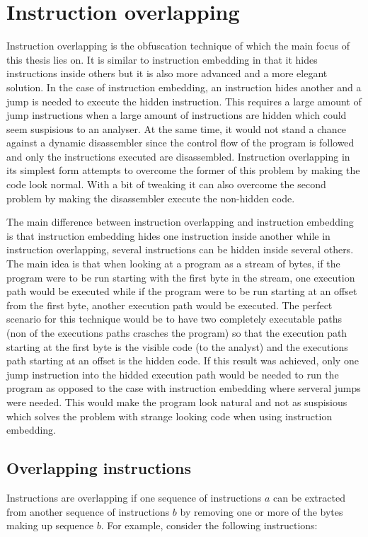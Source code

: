 \documentclass[11pt,twoside]{eitExjobb}
\begin{document}
\section{Instruction overlapping}
Instruction overlapping is the obfuscation technique of which the main focus of this thesis lies on. It is similar to instruction embedding in that it hides instructions inside others but it is also more advanced and a more elegant solution. In the case of instruction embedding, an instruction hides another and a jump is needed to execute the hidden instruction. This requires a large amount of jump instructions when a large amount of instructions are hidden which could seem suspisious to an analyser. At the same time, it would not stand a chance against a dynamic disassembler since the control flow of the program is followed and only the instructions executed are disassembled. Instruction overlapping in its simplest form attempts to overcome the former of this problem by making the code look normal. With a bit of tweaking it can also overcome the second problem by making the disassembler execute the non-hidden code.

The main difference between instruction overlapping and instruction embedding is that instruction embedding hides one instruction inside another while in instruction overlapping, several instructions can be hidden inside several others. The main idea is that when looking at a program as a stream of bytes, if the program were to be run starting with the first byte in the stream, one execution path would be executed while if the program were to be run starting at an offset from the first byte, another execution path would be executed. The perfect scenario for this technique would be to have two completely executable paths (non of the executions paths crasches the program) so that the execution path starting at the first byte is the visible code (to the analyst) and the executions path starting at an offset is the hidden code. If this result was achieved, only one jump instruction into the hidded execution path would be needed to run the program as opposed to the case with instruction embedding where serveral jumps were needed. This would make the program look natural and not as suspisious which solves the problem with strange looking code when using instruction embedding.\cite{instructionoverlapping}

\subsection{Overlapping instructions}
Instructions are overlapping if one sequence of instructions $a$ can be extracted from another sequence of instructions $b$ by removing one or more of the bytes making up sequence $b$. For example, consider the following instructions:
\end{document}
